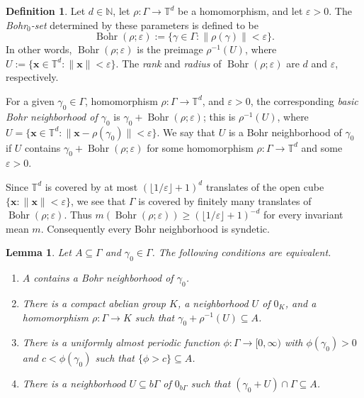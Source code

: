 \documentclass[12pt]{amsart} \usepackage{amsmath,centernot,amssymb,leftindex}
\newcommand{\Bohr}{\operatorname{Bohr}}
\newcommand{\mb}{\mathbf}
\newtheorem{lemma}[theorem]{Lemma}
\numberwithin{theorem}{section}
\numberwithin{equation}{section}
\theoremstyle{definition}
\newtheorem{definition}[theorem]{Definition}
\begin{document}
	
	\begin{definition}
		Let $d\in \mathbb N$, let $\rho:\Gamma \to \mathbb T^d$ be a homomorphism, and let $\varepsilon>0$.  The \emph{Bohr$_0$-set} determined by these parameters is defined to be
		\[
		\Bohr(\rho;\varepsilon):=\{\gamma\in \Gamma: \|\rho(\gamma)\|<\varepsilon\}.
		\]
		In other words, $\Bohr(\rho;\varepsilon)$ is the preimage $\rho^{-1}(U)$, where $U:=\{\mb x\in \mathbb T^d: \|\mb x\|<\varepsilon\}$.  The \emph{rank} and \emph{radius} of $\Bohr(\rho;\varepsilon)$ are $d$ and $\varepsilon$, respectively.
		
		For a given $\gamma_0\in \Gamma$,  homomorphism $\rho:\Gamma\to \mathbb T^d$, and $\varepsilon>0$, the corresponding \emph{basic Bohr neighborhood of $\gamma_0$} is $\gamma_0 + \Bohr(\rho;\varepsilon)$; this is $\rho^{-1}(U)$, where $U=\{\mb x\in \mathbb T^d:\|\mb x-\rho(\gamma_{0})\|<\varepsilon\}$. We say that $U$ is a Bohr neighborhood of $\gamma_{0}$ if $U$ contains $\gamma_{0}+\Bohr(\rho;\varepsilon)$ for some  homomorphism $\rho:\Gamma\to \mathbb T^{d}$ and some $\varepsilon>0$.
	\end{definition}
	Since $\mathbb T^d$ is covered by at most $(\lfloor 1/\varepsilon\rfloor+1)^{d}$ translates of the open cube $\{\mb x:\|\mb x\|<\varepsilon\}$, we see that $\Gamma$ is covered by finitely many translates of $\Bohr(\rho;\varepsilon)$.  Thus $m(\Bohr(\rho;\varepsilon))\geq  (\lfloor 1/\varepsilon\rfloor + 1)^{-d}$ for every invariant mean $m$. Consequently every Bohr neighborhood is syndetic.
	
	
	\begin{lemma}\label{lem:BohrEquivalents}
		Let $A\subseteq \Gamma$ and $\gamma_{0}\in \Gamma$.  The following conditions are equivalent.
		
		\begin{enumerate}
			\item[(B.1)] $A$ contains a Bohr neighborhood of $\gamma_{0}$.
			
			\item[(B.2)] There is a compact abelian group $K$, a neighborhood $U$ of $0_K$, and a homomorphism $\rho:\Gamma\to K$ such that $\gamma_{0}+\rho^{-1}(U)\subseteq A$.
			
			\item[(B.3)] There is a uniformly almost periodic function $\phi:\Gamma\to [0,\infty)$ with $\phi(\gamma_{0})>0$ and $c<\phi(\gamma_{0})$ such that $\{\phi >c\}\subseteq A$. 
			
			\item[(B.4)] There is a neighborhood $U\subseteq b\Gamma$ of $0_{b\Gamma}$ such that $(\gamma_{0}+U)\cap \Gamma\subseteq A$.
		\end{enumerate}
	\end{lemma}
	
\end{document}
